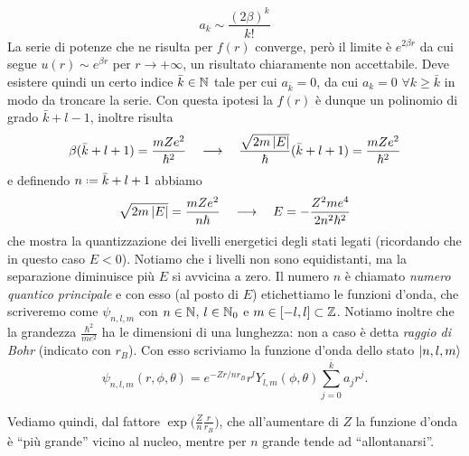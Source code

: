 \begin{equation}
	a_k\sim\frac{(2\beta)^k}{k!}
\end{equation}
La serie di potenze che ne risulta per $f(r)$ converge, però il limite è $e^{2\beta r}$ da cui segue $u(r)\sim e^{\beta r}$ per $r\to+\infty$, un risultato chiaramente non accettabile.
Deve esistere quindi un certo indice $\bar{k}\in\mathbb{N}$ tale per cui $a_{\bar{k}}=0$, da cui $a_k=0$ $\forall k\ge\bar{k}$ in modo da troncare la serie.
Con questa ipotesi la $f(r)$ è dunque un polinomio di grado $\bar{k}+l-1$, inoltre risulta
\begin{equation}
	\beta(\bar{k}+l+1)=\frac{mZe^2}{\hbar^2}\quad\longrightarrow\quad\frac{\sqrt{2m\left|{E}\right|}}{\hbar}(\bar{k}+l+1)=\frac{mZe^2}{\hbar^2}
\end{equation}
e definendo $n\defeq\bar{k}+l+1$ abbiamo
\begin{equation}
	\sqrt{2m\left|{E}\right|}=\frac{mZe^2}{n\hbar}\quad\longrightarrow\quad E=-\frac{Z^2me^4}{2n^2\hbar^2}
	\label{eq:energia-idrogeno}
\end{equation}
che mostra la quantizzazione dei livelli energetici degli stati legati (ricordando che in questo caso $E<0$).
Notiamo che i livelli non sono equidistanti, ma la separazione diminuisce più $E$ si avvicina a zero.
Il numero $n$ è chiamato \emph{numero quantico principale} e con esso (al posto di $E$) etichettiamo le funzioni d'onda, che scriveremo come $\psi_{n,l,m}$ con $n\in\mathbb{N}$, $l\in\mathbb{N}_0$ e $m\in[-l,l]\subset\mathbb{Z}$.
Notiamo inoltre che la grandezza $\frac{\hbar^2}{me^2}$ ha le dimensioni di una lunghezza: non a caso è detta \emph{raggio di Bohr} (indicato con $r_B$).
Con esso scriviamo la funzione d'onda dello stato $\left|{n,l,m}\right\rangle$
\begin{equation}
	\psi_{n,l,m}(r,\phi,\theta)=e^{-Zr/nr_B}r^lY_{l,m}(\phi,\theta)\sum_{j=0}^{\bar{k}}a_jr^j.
	\label{eq:wf-idrogeno}
\end{equation}

Vediamo quindi, dal fattore $\exp\big(\frac{Z}{n}\frac{r}{r_B}\big)$, che all'aumentare di $Z$ la funzione d'onda è ``più grande'' vicino al nucleo, mentre per $n$ grande tende ad ``allontanarsi''.

